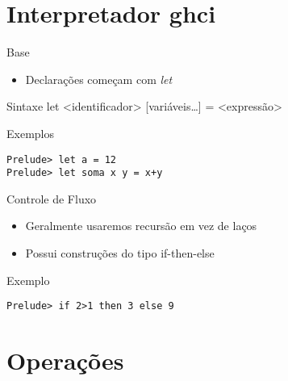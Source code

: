 \documentclass{beamer}
\begin{document}
\section{Interpretador ghci}

		\begin{frame}{}
		\end{frame}

	\begin{frame}[fragile]{Base}
	 	 \begin{itemize}
	 	  \item Declarações começam com \textit{let}
	 	 \end{itemize}
	 	 \begin{block}{Sintaxe}
	 	  let <identificador> {[}variáveis\dots{]} = <expressão>
	 	 \end{block}
	 	 \begin{block}{Exemplos}
	 	  \begin{lstlisting}
Prelude> let a = 12
Prelude> let soma x y = x+y
	 	  \end{lstlisting}
	 	 \end{block}
	\end{frame}
	
	\begin{frame}[fragile]{Controle de Fluxo}
		\begin{itemize}
		 \item Geralmente usaremos recursão em vez de laços
		 \item Possui construções do tipo if-then-else
		\end{itemize}
		
		\begin{block}{Exemplo}
		 \begin{lstlisting}
Prelude> if 2>1 then 3 else 9
		 \end{lstlisting}
		\end{block}
	\end{frame}
	
	\section{Operações}
	
	\begin{frame}{}
	\end{frame}
	
\end{document}
